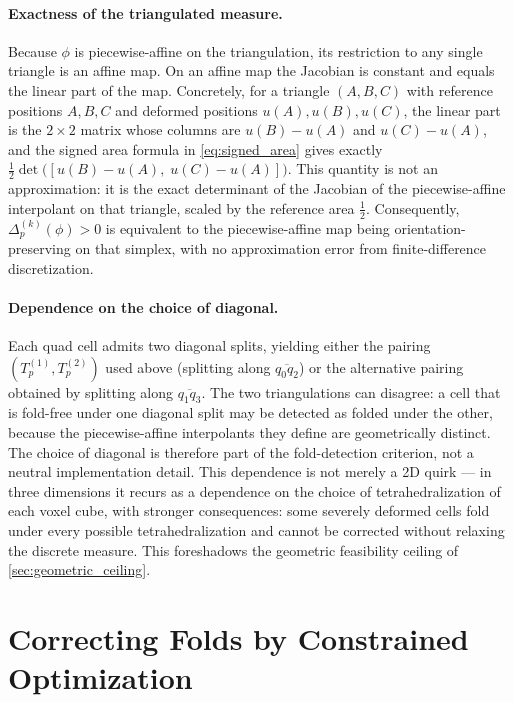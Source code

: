 \documentclass[lettersize,journal]{IEEEtran}
\begin{document}
\paragraph{Exactness of the triangulated measure.}
Because $\phi$ is piecewise-affine on the triangulation, its restriction to any single triangle is an affine map. On an affine map the Jacobian is constant and equals the linear part of the map. Concretely, for a triangle $(A, B, C)$ with reference positions $A, B, C$ and deformed positions $u(A), u(B), u(C)$, the linear part is the $2\times 2$ matrix whose columns are $u(B)-u(A)$ and $u(C)-u(A)$, and the signed area formula in \autoref{eq:signed_area} gives exactly $\tfrac{1}{2}\det\bigl([u(B)-u(A),\; u(C)-u(A)]\bigr)$. This quantity is not an approximation: it is the exact determinant of the Jacobian of the piecewise-affine interpolant on that triangle, scaled by the reference area $\tfrac{1}{2}$. Consequently, $\Delta^{(k)}_p(\phi) > 0$ is equivalent to the piecewise-affine map being orientation-preserving on that simplex, with no approximation error from finite-difference discretization.

\paragraph{Dependence on the choice of diagonal.}
Each quad cell admits two diagonal splits, yielding either the pairing $(T^{(1)}_p, T^{(2)}_p)$ used above (splitting along $\overline{q_0 q_2}$) or the alternative pairing obtained by splitting along $\overline{q_1 q_3}$. The two triangulations can disagree: a cell that is fold-free under one diagonal split may be detected as folded under the other, because the piecewise-affine interpolants they define are geometrically distinct. The choice of diagonal is therefore part of the fold-detection criterion, not a neutral implementation detail. This dependence is not merely a 2D quirk — in three dimensions it recurs as a dependence on the choice of tetrahedralization of each voxel cube, with stronger consequences: some severely deformed cells fold under every possible tetrahedralization and cannot be corrected without relaxing the discrete measure. This foreshadows the geometric feasibility ceiling of \autoref{sec:geometric_ceiling}.


\section{Correcting Folds by Constrained Optimization}
\label{sec:optimization_formulation}
\end{document}
